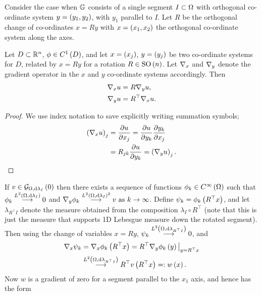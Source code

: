 Consider the case when $\mathbb{G}$ consists of a single segment $I\subset\Omega$ with orthogonal co-ordinate system $y=\left( y_1,y_2 \right)$, with $y_1$ parallel to $I$.
Let $R$ be the orthogonal change of co-ordinates $x=Ry$ with $x=\left( x_1,x_2 \right)$ the orthogonal co-ordinate system along the axes. 
\begin{lemma}
	Let $D\subset\mathbb{R}^n$, $\phi\in C^1\left( D \right)$, and let $x=\left( x_j \right)$, $y=\left( y_j \right)$ be two co-ordinate systems for $D$, related by $x=Ry$ for a rotation $R\in\mathrm{SO}\left( n \right)$.
	Let $\nabla_x$ and $\nabla_y$ denote the gradient operator in the $x$ and $y$ co-ordinate systems accordingly.
	Then
	\begin{align*}
		\nabla_x u &= R \nabla_y u, \\
		\nabla_y u &= R^{\top} \nabla_x u.
	\end{align*}
\end{lemma}
\begin{proof}
	We use index notation to save explicitly writing summation symbols;
	\begin{align*}
		\left( \nabla_x u \right)_j &= \dfrac{\partial u}{\partial x_j} = \dfrac{\partial u}{\partial y_k}\dfrac{\partial y_k}{\partial x_j} \\
		&= R_{jk}\dfrac{\partial u}{\partial y_k} = \left( \nabla_y u \right)_j.
	\end{align*}
\end{proof}
If $v\in\mathcal{G}_{ \Omega, \mathrm{d}\lambda_I}\left( 0 \right)$ then there exists a sequence of functions $\phi_k\in C^{\infty}\left( \Omega \right)$ such that $\phi_k\overset{L^{2}\left( \Omega,\mathrm{d}\lambda_I \right)}{\longrightarrow}0$ and $\nabla_y\phi_k\overset{L^{2}\left( \Omega,\mathrm{d}\lambda_I \right)^2}{\longrightarrow} v \ \text{as} \ k \rightarrow\infty$.
Define $\psi_k = \phi_k\left( R^{\top}x \right)$, and let $\lambda_{R^{\top}I}$ denote the measure obtained from the composition $\lambda_I\circ R^{\top}$ (note that this is just the measure that supports 1D Lebesgue measure down the rotated segment).
Then using the change of variables $x=Ry$, $\psi_k\overset{L^{2}\left( \Omega,\mathrm{d}\lambda_{R^{\top}I} \right)}{\longrightarrow}0$, and
\begin{align*}
	\nabla_x\psi_k &= \nabla_x\phi_k\left( R^{\top}x \right) = R^{\top}\nabla_y\phi_k\left( y \right)\big\vert_{y=R^{\top}x} \\
	&\overset{L^{2}\left( \Omega,\mathrm{d}\lambda_{R^{\top}I} \right)}{\longrightarrow} R^{\top}v\left( R^{\top}x \right) =: w\left( x \right).
\end{align*}
Now $w$ is a gradient of zero for a segment parallel to the $x_1$ axis, and hence has the form
